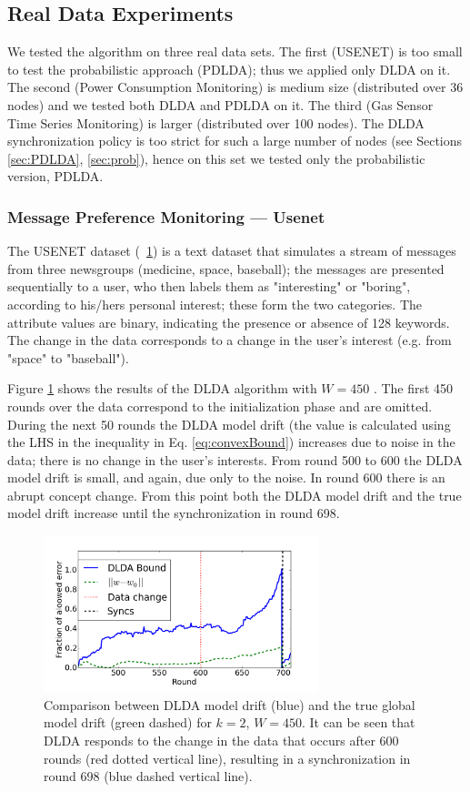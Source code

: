 \subsection{Real Data Experiments}
\label{sec:real}
We tested the algorithm on three real data sets. The first
(USENET) is too small to test the probabilistic approach (PDLDA); thus we applied
only DLDA on it.
The second (Power Consumption Monitoring) is medium size  
(distributed over 36 nodes) and we tested both DLDA and PDLDA on it.
The third (Gas Sensor Time Series Monitoring) is larger (distributed over
100 nodes). The DLDA synchronization policy is too strict for such a large number of nodes
(see Sections \ref{sec:PDLDA}, \ref{sec:prob}),
hence on this set we tested only the probabilistic version, PDLDA.
%
\subsubsection{Message Preference Monitoring --- Usenet}
The USENET dataset (~\ref{usenet}) is a text dataset that simulates a stream of messages 
from three newsgroups (medicine, space, baseball); 
the messages are presented sequentially to a user, who then labels them as "interesting" or "boring", 
according to his/hers personal interest; these form the two categories.
The attribute values are binary, indicating the presence or absence of 128 keywords. 
The change in the data corresponds to a change in the user's interest (e.g. from "space" to "baseball"). 

Figure \ref{usenet} shows the results of the DLDA algorithm with $W=450$ . The first 450 rounds over the data correspond to
the initialization phase and are omitted. During the next 50 rounds the DLDA model drift 
(the value is calculated using the LHS in the inequality in Eq. \ref{eq:convexBound}) 
increases due to noise in the data; there is no change in the user's
interests.
From round 500 to 600 the DLDA model drift is small, and again, due only to the noise. In round 600 there is an abrupt concept
change.
From this point both the DLDA model drift and the true model drift increase until the synchronization in round 698.
\begin{figure}
	\centering
	\includegraphics[width=8cm]{graphics/DriftDetected.png}
	\caption{Comparison between DLDA model drift (blue)
	and the true global model drift (green dashed) for $k=2$, $W=450$.
	It can be seen that DLDA responds to the change in the data that occurs
	after 600 rounds (red dotted vertical line), resulting in a synchronization in 
	round 698 (blue dashed vertical line).}
	\label{usenet}
	\end{figure}
	


